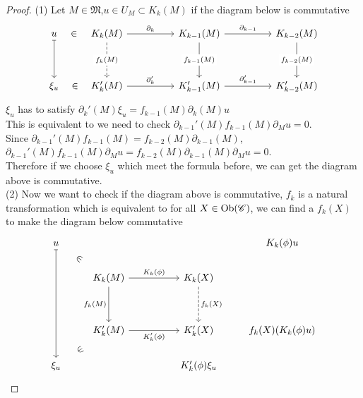 \documentclass{article}
\begin{document}
\begin{proof}
    (1) Let $M \in \mathfrak{M}$,$u\in U_M\subset K_k(M)$ if the diagram below is commutative
    \[\begin{tikzcd}
        u & {K_k(M)} && {K_{k-1}(M)} && {K_{k-2}(M)} \\
        \\
        {\xi_u} & {K'_k(M)} && {K'_{k-1}(M)} && {K'_{k-2}(M)}
        \arrow["{\partial_k}", from=1-2, to=1-4]
        \arrow["{\partial_{k-1}}", from=1-4, to=1-6]
        \arrow["{\partial'_k}", from=3-2, to=3-4]
        \arrow["{\partial_{k-1}'}", from=3-4, to=3-6]
        \arrow["{f_{k-1}(M)}"{description}, from=1-4, to=3-4]
        \arrow["{f_{k-2}(M)}"{description}, from=1-6, to=3-6]
        \arrow["{f_k(M)}"{description}, dashed, from=1-2, to=3-2]
        \arrow["\in"{marking}, draw=none, from=1-1, to=1-2]
        \arrow[maps to, from=1-1, to=3-1]
        \arrow["\in"{marking}, draw=none, from=3-1, to=3-2]
    \end{tikzcd}\]
    $\xi_u$ has to satisfy $\partial_k'(M)\xi_u = f_{k-1}(M)\partial_k(M)u$\\
    This is equivalent to we need to check $\partial_{k-1}'(M)f_{k-1}(M) \partial_M u = 0$. \\
    Since $\partial_{k-1}'(M) f_{k-1}(M) = f_{k-2}(M) \partial_{k-1}(M)$, $\partial_{k-1}'(M)f_{k-1}(M)\partial_M u = f_{k-2}(M) \partial_{k-1}(M)\partial_M u = 0$.\\
    Therefore if we choose $\xi_u$ which meet the formula before, we can get the diagram above is commutative.\\
    (2) Now we want to check if the diagram above is commutative, $f_k$ is a natural transformation which is equivalent to for all $X\in \operatorname{Ob}(\mathscr{C})$, we can find a $f_k(X)$ to make the diagram below commutative
    \[\begin{tikzcd}
        u &&&& {K_k(\phi)u} \\
        & {K_k(M)} && {K_k(X)} \\
        \\
        & {K_k'(M)} && {K_k'(X)} & {f_k(X)(K_k(\phi)u)} \\
        {\xi_u} &&& {K'_k(\phi)\xi_u}
        \arrow["{f_k(M)}"', from=2-2, to=4-2]
        \arrow["{K_k(\phi)}", from=2-2, to=2-4]
        \arrow["{f_k(X)}", dashed, from=2-4, to=4-4]
        \arrow["{K'_k(\phi)}"', from=4-2, to=4-4]
        \arrow["\in"{marking}, draw=none, from=1-1, to=2-2]
        \arrow["\in"{marking}, draw=none, from=5-1, to=4-2]
        \arrow[maps to, from=1-1, to=5-1]

\end{tikzcd}\]
\end{proof}
\end{document}
